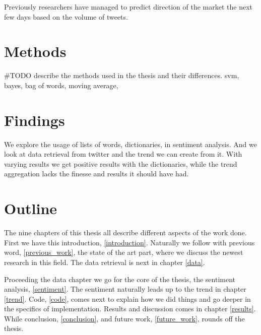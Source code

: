 Previously researchers have managed to predict direction of the market the
next few days based on the volume of tweets. 

\section{Methods}
#TODO describe the methods used in the thesis and their differences. 
svm,  bayes, bag of words, moving average, 


\section{Findings}
We explore the usage of lists of words, dictionaries, in sentiment analysis.
And we look at data retrieval from twitter and the trend we can create from it. 
With varying results we get positive results with the dictionaries, while the
trend aggregation lacks the finesse and results it should have had. 

\section{Outline}
The nine chapters of this thesis all describe different aspects of the work
done. First we have this introduction, \ref{introduction}. Naturally we follow
with previous word, \ref{previous_work}, the state of the art part, where we
discuss the newest research in this field. The data retrieval is next in
chapter \ref{data}. 

Proceeding the data chapter we go for the core of the thesis, the sentiment
analysis, \ref{sentiment}. The sentiment naturally leads up to the trend in
chapter \ref{trend}. Code, \ref{code}, comes next to explain how we did things
and go deeper in the specifics of implementation. Results and discussion comes
in chapter \ref{results}. While conclusion, \ref{conclusion}, and future work,
\ref{future_work}, rounds off the thesis.
%
